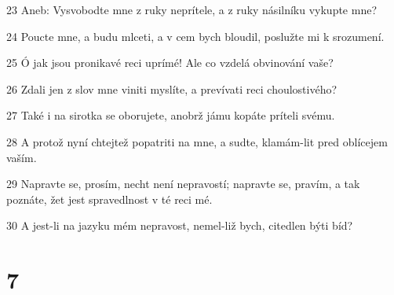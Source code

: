 \par 23 Aneb: Vysvobodte mne z ruky neprítele, a z ruky násilníku vykupte mne?
\par 24 Poucte mne, a budu mlceti, a v cem bych bloudil, poslužte mi k srozumení.
\par 25 Ó jak jsou pronikavé reci uprímé! Ale co vzdelá obvinování vaše?
\par 26 Zdali jen z slov mne viniti myslíte, a prevívati reci choulostivého?
\par 27 Také i na sirotka se oborujete, anobrž jámu kopáte príteli svému.
\par 28 A protož nyní chtejtež popatriti na mne, a sudte, klamám-lit pred oblícejem vaším.
\par 29 Napravte se, prosím, necht není nepravostí; napravte se, pravím, a tak poznáte, žet jest spravedlnost v té reci mé.
\par 30 A jest-li na jazyku mém nepravost, nemel-liž bych, citedlen býti bíd?

\chapter{7}

